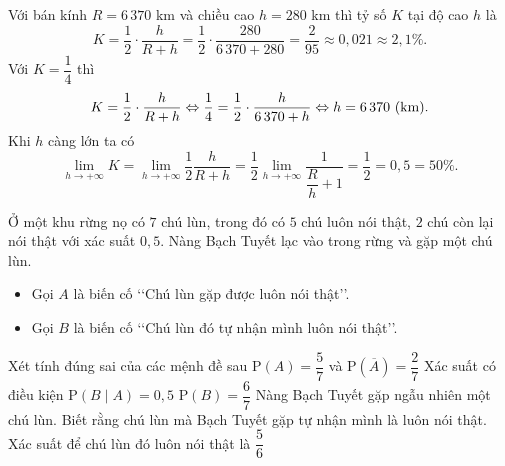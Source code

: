 \begin{ex}
{\begin{itemchoice}
\[			\]
			\itemch Với bán kính $R=6\,370$ km và chiều cao $h=280$ km thì tỷ số $K$ tại độ cao $h$ là
			\[
			K=\dfrac{1}{2}\cdot \dfrac{h}{R+h}=\dfrac{1}{2}\cdot \dfrac{280}{6\,370+280}=\dfrac{2}{95}\approx0{,}021\approx 2{,}1\%.
			\]		
			\itemch Với $K=\dfrac{1}{4}$ thì
			\[
			K=\dfrac{1}{2}\cdot \dfrac{h}{R+h}\Leftrightarrow \dfrac{1}{4}=\dfrac{1}{2}\cdot \dfrac{h}{6\,370+h}\Leftrightarrow h=6\,370\,\,\rm{(km)}.\]
			\itemch 	Khi $h$ càng lớn ta có
			\[
			\lim\limits_{h\rightarrow +\infty} K =\lim\limits_{h\rightarrow +\infty} \dfrac{1}{2}\dfrac{h}{R+h}=\dfrac{1}{2}\lim\limits_{h\rightarrow +\infty} \dfrac{1}{\dfrac{R}{h}+1}=\dfrac{1}{2}=0{,}5=50\%.
			\]
		\end{itemchoice}
	}
\end{ex}
\begin{ex}%
	Ở một khu rừng nọ có $7$ chú lùn, trong đó có $5$ chú luôn nói thật, $2$ chú còn lại nói thật với xác suất $0{,}5$. Nàng Bạch Tuyết lạc vào trong rừng và gặp một chú lùn.
	\begin{itemize}
		\item Gọi $A$ là biến cố \lq\lq Chú lùn gặp được luôn nói thật\rq\rq.
		\item Gọi $B$ là biến cố \lq\lq Chú lùn đó tự nhận mình luôn nói thật\rq\rq.
	\end{itemize}
	Xét tính đúng sai của các mệnh đề sau\vspace{5pt}
	\choiceTF
	{\True $\mathrm{P}(A)=\dfrac{5}{7}$ và $\mathrm{P}(\overline{A})=\dfrac{2}{7}$}
	{Xác suất có điều kiện $\mathrm{P}(B\mid A)=0{,}5$}
	{\True $\mathrm{P}(B)=\dfrac{6}{7}$}
	{\True Nàng Bạch Tuyết gặp ngẫu nhiên một chú lùn. Biết rằng chú lùn mà Bạch Tuyết gặp tự nhận mình là luôn nói thật. Xác suất để chú lùn đó luôn nói thật là $\dfrac{5}{6}$}
\end{ex}
